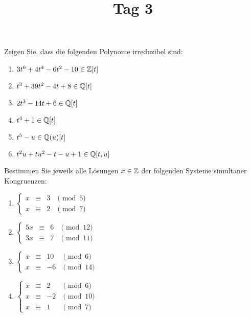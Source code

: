 \documentclass[a4paper, 10pt]{scrartcl}
\title{Tag 3}
\author{}
\date{}
\begin{document}
\begin{question}
  Zeigen Sie, dass die folgenden Polynome irreduzibel sind:
  \begin{enumerate}
    \item
      $3t^6 + 4t^4 - 6t^2 - 10 \in \mathbb{Z}[t]$
    \item
      $t^3 + 39t^2 - 4t + 8 \in \mathbb{Q}[t]$
    \item
      $2t^3 - 14t + 6 \in \mathbb{Q}[t]$
    \item
      $t^4 + 1 \in \mathbb{Q}[t]$
    \item
      $t^5 - u \in \mathbb{Q}(u)[t]$
    \item
      $t^2 u + tu^2 - t - u + 1 \in \mathbb{Q}[t,u]$
  \end{enumerate}
\end{question}

\begin{question}
  Bestimmen Sie jeweils alle Lösungen $x \in \mathbb{Z}$ der folgenden Systeme simultaner Kongruenzen:
  \begin{enumerate}
    \item
      $
        \left\{
          \begin{array}{ccrl}
            x &\equiv& 3 & \pmod{5}  \\
            x &\equiv& 2 & \pmod{7}
          \end{array}
        \right.
      $
    \item
      $
        \left\{
          \begin{array}{ccrl}
            5x &\equiv& 6 & \pmod{12}  \\
            3x &\equiv& 7 & \pmod{11}
          \end{array}
        \right.
      $
    \item
      $
        \left\{
          \begin{array}{ccrl}
            x &\equiv& 10 & \pmod{6}  \\
            x &\equiv& -6 & \pmod{14}
          \end{array}
        \right.
      $
    \item
      $
        \left\{
          \begin{array}{ccrl}
            x &\equiv&  2 & \pmod{6}  \\
            x &\equiv& -2 & \pmod{10} \\
            x &\equiv&  1 & \pmod{7}
          \end{array}
        \right.
      $
  \end{enumerate}
\end{question}
\end{document}
